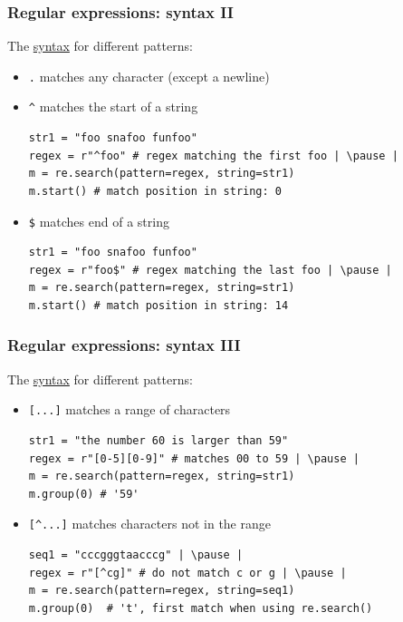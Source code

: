 \documentclass[xcolor=table]{beamer}
\begin{document}
\begin{frame}[fragile]
    \frametitle{Regular expressions: syntax II}
    
    The \href{https://docs.python.org/3.7/library/re.html#regular-expression-syntax}{syntax} for different patterns:
    \begin{itemize}
        \item\texttt{.} matches any character (except a newline) \pause
        \item\texttt{\^} matches the start of a string \pause
\begin{lstlisting}[style=python,belowskip=-1.5 \baselineskip]
str1 = "foo snafoo funfoo"
regex = r"^foo" # regex matching the first foo | \pause |  
m = re.search(pattern=regex, string=str1) 
m.start() # match position in string: 0
\end{lstlisting} \pause
        \item\texttt{\$} matches end of a string 
\begin{lstlisting}[style=python,belowskip=-1.5 \baselineskip]
str1 = "foo snafoo funfoo"
regex = r"foo$" # regex matching the last foo | \pause |  
m = re.search(pattern=regex, string=str1) 
m.start() # match position in string: 14 
\end{lstlisting} \pause
    \end{itemize}
\end{frame}
\begin{frame}[fragile]
    \frametitle{Regular expressions: syntax III}
    
    The \href{https://docs.python.org/3.7/library/re.html#regular-expression-syntax}{syntax} for different patterns:
    \begin{itemize}
    \item \texttt{[...]} matches a range of characters
\begin{lstlisting}[style=python,belowskip=-1.5 \baselineskip]
str1 = "the number 60 is larger than 59"
regex = r"[0-5][0-9]" # matches 00 to 59 | \pause |  
m = re.search(pattern=regex, string=str1) 
m.group(0) # '59'
\end{lstlisting} 
    \item \texttt{[\textasciicircum...]} matches characters not in the range 
\begin{lstlisting}[style=python,belowskip=-1.5 \baselineskip]
seq1 = "cccgggtaacccg" | \pause |
regex = r"[^cg]" # do not match c or g | \pause |  
m = re.search(pattern=regex, string=seq1) 
m.group(0)  # 't', first match when using re.search()
\end{lstlisting} 
    \end{itemize}
\end{frame}
\end{document}
